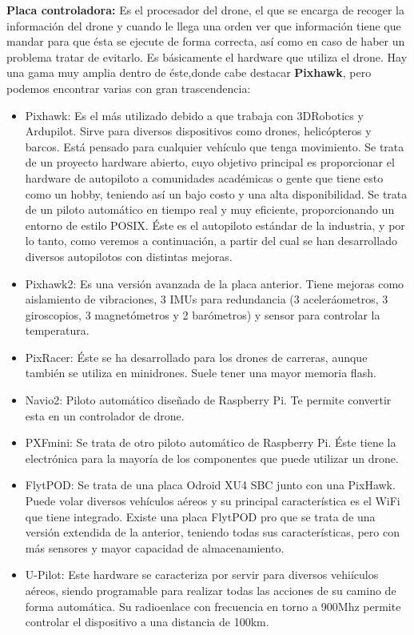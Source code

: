 \hspace{1 cm}\textbf{Placa controladora:} Es el procesador del drone, el que se encarga de recoger la informaci\'on del drone y cuando le llega una orden ver que informaci\'on tiene que mandar para que \'esta se ejecute de forma correcta, as\'i como en caso de haber un problema tratar de evitarlo. Es b\'asicamente el hardware que utiliza el drone. Hay una gama muy amplia dentro de \'este,donde cabe destacar \textbf{Pixhawk}, pero podemos encontrar varias con gran trascendencia: 
	\begin{itemize}
		\item Pixhawk: Es el m\'as utilizado debido a que trabaja con 3DRobotics y Ardupilot. Sirve para diversos dispositivos como drones, helic\'opteros y barcos. Est\'a pensado para cualquier veh\'iculo que tenga movimiento. Se trata de un proyecto hardware abierto, cuyo objetivo principal es proporcionar el hardware de autopiloto a comunidades acad\'emicas o gente que tiene esto como un hobby, teniendo as\'i un bajo costo y una alta disponibilidad. Se trata de un piloto autom\'atico en tiempo real y muy eficiente, proporcionando un entorno de estilo POSIX. \'Este es el autopiloto est\'andar de la industria, y por lo tanto, como veremos a continuaci\'on, a partir del cual se han desarrollado diversos autopilotos con distintas mejoras. 

		\item Pixhawk2: Es una versi\'on avanzada de la placa anterior. Tiene mejoras como aislamiento de vibraciones, 3 IMUs para redundancia (3 aceler\'aometros, 3 giroscopios, 3 magnet\'ometros y 2 bar\'ometros) y sensor para controlar la temperatura. 

		\item PixRacer: \'Este se ha desarrollado para los drones de carreras, aunque tambi\'en se utiliza en minidrones. Suele tener una mayor memoria flash.

		\item Navio2: Piloto autom\'atico diseñado de Raspberry Pi. Te permite convertir esta en un controlador de drone. 

		\item PXFmini: Se trata de otro piloto autom\'atico de Raspberry Pi. \'Este tiene la electr\'onica para la mayor\'ia de los componentes que puede utilizar un drone. 

		\item FlytPOD: Se trata de una placa Odroid XU4 SBC junto con una PixHawk. Puede volar diversos veh\'iculos a\'ereos y su principal caracter\'istica es el WiFi que tiene integrado. Existe una placa FlytPOD pro que se trata de una versi\'on extendida de la anterior, teniendo todas sus caracter\'isticas, pero con m\'as sensores y mayor capacidad de almacenamiento. 

		\item U-Pilot: Este hardware se caracteriza por servir para diversos vehi\'iculos a\'ereos, siendo programable para realizar todas las acciones de su camino de forma autom\'atica. Su radioenlace con frecuencia en torno a 900Mhz permite controlar el dispositivo a una distancia de 100km. 
	\end{itemize}

